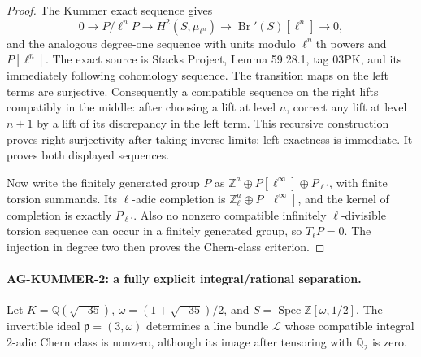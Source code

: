 \begin{proof}
The Kummer exact sequence gives
\[
 0\longrightarrow P/\ell^nP
 \longrightarrow H^2(S,\mu_{\ell^n})
 \longrightarrow\operatorname{Br}'(S)[\ell^n]\longrightarrow0,
\]
and the analogous degree-one sequence with units modulo $\ell^n$th
powers and $P[\ell^n]$. The exact source is Stacks Project,
Lemma 59.28.1, tag 03PK, and its immediately following cohomology
sequence. The transition maps on the left terms are surjective.
Consequently a compatible sequence on the right lifts compatibly in
the middle: after choosing a lift at level $n$, correct any lift at
level $n+1$ by a lift of its discrepancy in the left term. This recursive
construction proves right-surjectivity after taking inverse limits;
left-exactness is immediate. It proves both displayed sequences.

Now write the finitely generated group $P$ as
$\mathbb Z^a\oplus P[\ell^\infty]\oplus P_{\ell'}$, with finite torsion
summands. Its $\ell$-adic completion is
$\mathbb Z_\ell^a\oplus P[\ell^\infty]$, and the kernel of completion
is exactly $P_{\ell'}$. Also no nonzero compatible infinitely
$\ell$-divisible torsion sequence can occur in a finitely generated
group, so $T_\ell P=0$. The injection in degree two then proves the
Chern-class criterion.
\end{proof}

\paragraph{AG-KUMMER-2: a fully explicit integral/rational separation.}
Let $K=\mathbb Q(\sqrt{-35})$, $\omega=(1+\sqrt{-35})/2$, and
$S=\operatorname{Spec}\mathbb Z[\omega,1/2]$. The invertible ideal
$\mathfrak p=(3,\omega)$ determines a line bundle $\mathcal L$ whose
compatible integral $2$-adic Chern class is nonzero, although its image
after tensoring with $\mathbb Q_2$ is zero.

